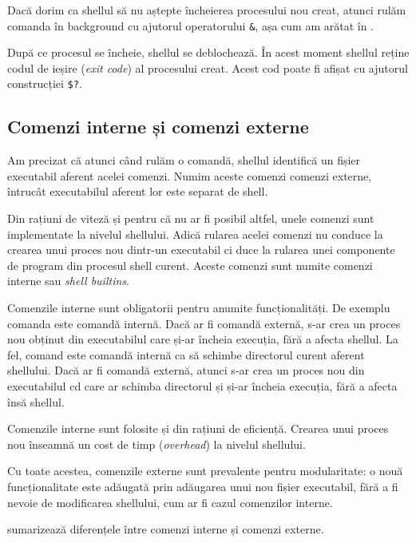 Dacă dorim ca shellul să nu aștepte încheierea procesului nou creat, atunci
rulăm comanda în background cu ajutorul operatorului \texttt{\&}, așa cum am arătat în
.

După ce procesul se încheie, shellul se deblochează. În
acest moment shellul reține codul de ieșire (\textit{exit code}) al procesului creat.
Acest cod poate fi afișat cu ajutorul construcției \texttt{\$?}.

\subsection{Comenzi interne și comenzi externe}
\label{sec:cli:shell:command-types}

Am precizat că atunci când rulăm o comandă, shellul identifică un fișier
executabil aferent acelei comenzi. Numim aceste comenzi comenzi externe,
întrucât executabilul aferent lor este separat de shell.

Din rațiuni de viteză și pentru că nu ar fi posibil altfel, unele comenzi sunt
implementate la nivelul shellului. Adică rularea acelei comenzi nu conduce la
crearea unui proces nou dintr-un executabil ci duce la rularea unei componente
de program din procesul shell curent. Aceste comenzi sunt numite comenzi interne
sau \textit{shell builtins}.

Comenzile interne sunt obligatorii pentru anumite funcționalități. De exemplu
comanda  este comandă internă. Dacă ar fi comandă externă, s-ar crea un
proces nou obținut din executabilul  care și-ar încheia execuția, fără a
afecta shellul. La fel, comand  este comandă internă ca să schimbe directorul
curent aferent shellului. Dacă ar fi comandă externă, atunci s-ar crea un
proces nou din executabilul cd care ar schimba directorul și și-ar încheia
execuția, fără a afecta însă shellul.

Comenzile interne sunt folosite și din rațiuni de eficiență. Crearea unui proces
nou înseamnă un cost de timp (\textit{overhead}) la nivelul shellului.

Cu toate acestea, comenzile externe sunt prevalente pentru modularitate: o nouă
funcționalitate este adăugată prin adăugarea unui nou fișier executabil, fără a
fi nevoie de modificarea shellului, cum ar fi cazul comenzilor interne.

 sumarizează diferențele între comenzi interne și comenzi
externe.


